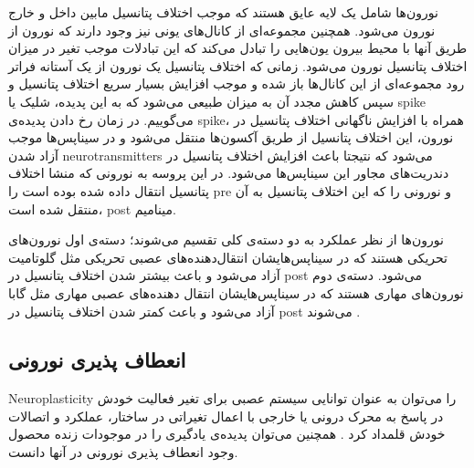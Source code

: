 \documentclass[12pt]{report}
\begin{document}
	
	نورون‌ها شامل یک لایه عایق هستند که موجب اختلاف پتانسیل مابین داخل و خارج نورون می‌شود. همچنین مجموعه‌ای از کانال‌های یونی نیز وجود دارند که نورون از طریق آنها با محیط بیرون یون‌هایی را تبادل می‌کند که این تبادلات موجب تغیر در میزان اختلاف پتانسیل نورون می‌شود. زمانی که اختلاف پتانسیل یک نورون از یک آستانه فراتر رود مجموعه‌ای از این کانال‌ها باز شده و موجب افزایش بسیار سریع اختلاف پتانسیل و سپس کاهش مجدد آن به میزان طبیعی می‌شود که به این پدیده، شلیک یا \gls{spike} می‌گوییم. در زمان رخ دادن پدیده‌ی \gls{spike}، همراه با افزایش ناگهانی اختلاف پتانسیل در نورون، این اختلاف پتانسیل از طریق آکسون‌ها منتقل می‌شود و در سیناپس‌ها موجب آزاد شدن \gls{neurotransmitters} می‌شود که نتیجتا باعث افزایش اختلاف پتانسیل در دندریت‌های مجاور این سیناپس‌ها می‌شود. در این پروسه به نورونی که منشا اختلاف پتانسیل انتقال داده شده بوده است را \gls{pre}‌ و نورونی را که این اختلاف پتانسیل به آن منتقل شده است، \gls{post}‌ مینامیم.
	
	نورون‌ها از نظر عملکرد به دو دسته‌ی کلی تقسیم می‌شوند؛ دسته‌ی اول نورون‌های تحریکی هستند که در سیناپس‌هایشان انتقال‌دهنده‌های عصبی تحریکی مثل گلوتامیت آزاد می‌شود و باعث بیشتر شدن اختلاف پتانسیل در \gls{post} می‌شود. دسته‌ی دوم نورون‌های مهاری هستند که در سیناپس‌هایشان انتقال دهنده‌های عصبی مهاری مثل گابا آزاد می‌شود و باعث کمتر شدن اختلاف پتانسیل در \gls{post} می‌شوند
	\cite{Purves2001-ns}.
	
	
	\subsection{انعطاف پذیری نورونی}
	
	\gls{Neuroplasticity} را می‌توان به عنوان توانایی سیستم عصبی برای تغیر فعالیت خودش در پاسخ به محرک درونی یا خارجی با اعمال تغیراتی در ساختار، عملکرد و اتصالات خودش قلمداد کرد
	\cite{MateosAparicio2019}.
	همچنین می‌توان پدیده‌ی یادگیری را در موجودات زنده محصول وجود انعطاف پذیری نورونی در آنها دانست.
	
\end{document}
